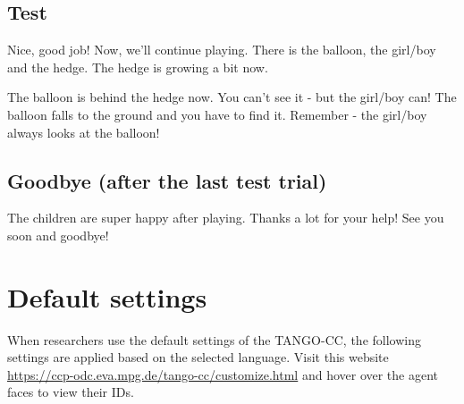 \documentclass[
  man,floatsintext]{apa7}
\begin{document}
\subsection{Test}\label{test}

Nice, good job! Now, we'll continue playing. There is the balloon, the girl/boy and the hedge. The hedge is growing a bit now.

The balloon is behind the hedge now. You can't see it - but the girl/boy can! The balloon falls to the ground and you have to find it. Remember - the girl/boy always looks at the balloon!

\subsection{Goodbye (after the last test trial)}\label{goodbye-after-the-last-test-trial}

The children are super happy after playing. Thanks a lot for your help! See you soon and goodbye!

\section{Default settings}\label{default-settings}

When researchers use the default settings of the TANGO-CC, the following settings are applied based on the selected language. Visit this website \url{https://ccp-odc.eva.mpg.de/tango-cc/customize.html} and hover over the agent faces to view their IDs.
\end{document}
